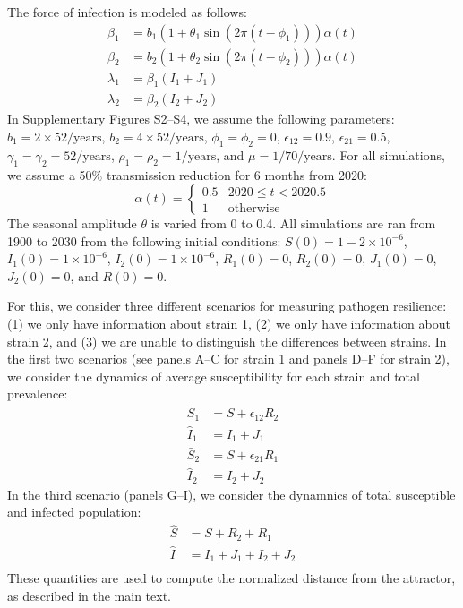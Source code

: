 \documentclass[12pt]{article}
\begin{document}
The force of infection is modeled as follows:
\begin{align}
\beta_1 &= b_1 (1 + \theta_1 \sin(2 \pi (t-\phi_1))) \alpha(t)\\
\beta_2 &= b_2 (1 + \theta_2 \sin(2 \pi (t-\phi_2))) \alpha(t)\\
\lambda_1 &= \beta_1 (I_1 + J_1)\\
\lambda_2 &= \beta_2 (I_2 + J_2)
\end{align}
In Supplementary Figures S2--S4, we assume the following parameters:
$b_1 = 2 \times 52/\mathrm{years}$, $b_2 = 4 \times 52/\mathrm{years}$, $\phi_1 = \phi_2 = 0$, $\epsilon_{12} = 0.9$, $\epsilon_{21} = 0.5$,
$\gamma_1 = \gamma_2 = 52/\mathrm{years}$, $\rho_1 = \rho_2 = 1/\mathrm{years}$, and $\mu=1/70/\mathrm{years}$.
For all simulations, we assume a 50\% transmission reduction for 6 months from 2020:
\begin{equation}
\alpha(t) = \begin{cases}
0.5 & 2020 \leq t< 2020.5\\
1 & \textrm{otherwise}
\end{cases}
\end{equation}
The seasonal amplitude $\theta$ is varied from 0 to 0.4.
All simulations are ran from 1900 to 2030 from the following initial conditions: 
$S(0) = 1 - 2\times 10^{-6}$, $I_1(0) = 1 \times 10^{-6}$, $I_2(0) = 1 \times 10^{-6}$, $R_1(0) = 0$, $R_2(0) = 0$, $J_1(0) = 0$, $J_2(0) = 0$, and $R(0) = 0$.

For this, we consider three different scenarios for measuring pathogen resilience: (1) we only have information about strain 1, (2) we only have information about strain 2, and (3) we are unable to distinguish the differences between strains.
In the first two scenarios (see panels A--C for strain 1 and panels D--F for strain 2), we consider the dynamics of average susceptibility for each strain and total prevalence:
\begin{align}
\bar{S}_1 &= S + \epsilon_{12} R_2\\
\hat{I}_1 &= I_1 + J_1\\
\bar{S}_2 &= S + \epsilon_{21} R_1\\
\hat{I}_2 &= I_2 + J_2
\end{align}
In the third scenario (panels G--I), we consider the dynamnics of total susceptible and infected population:
\begin{align}
\hat{S} &= S + R_2 + R_1\\
\hat{I} &= I_1 + J_1 + I_2 + J_2\\
\end{align}
These quantities are used to compute the normalized distance from the attractor, as described in the main text.
\end{document}
